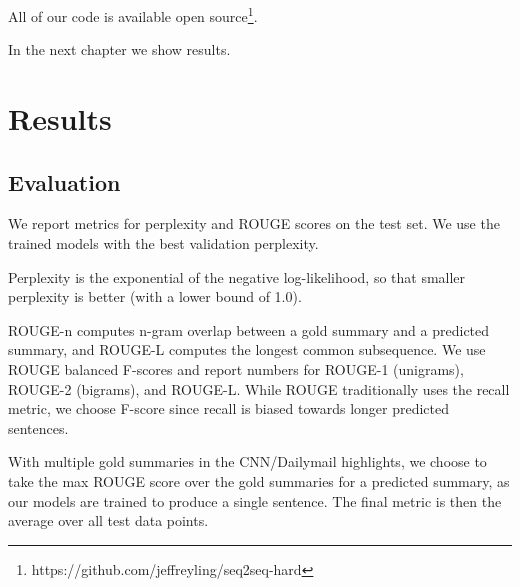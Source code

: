 \documentclass[12pt]{report}
\begin{document}
All of our code is available open source\footnote{https://github.com/jeffreyling/seq2seq-hard}.

In the next chapter we show results.

\chapter{Results}
\label{chap:results}

\section{Evaluation}

We report metrics for perplexity and ROUGE scores \citep{lin2004rouge} on the test set. We use the trained models with the best validation perplexity.

Perplexity is the exponential of the negative log-likelihood, so that smaller perplexity is better (with a lower bound of 1.0).

ROUGE-n computes n-gram overlap between a gold summary and a predicted summary, and ROUGE-L computes the longest common subsequence.
We use ROUGE balanced F-scores and report numbers for ROUGE-1 (unigrams), ROUGE-2 (bigrams), and ROUGE-L. While ROUGE traditionally uses the recall metric, we choose F-score since recall is biased towards longer predicted sentences.

With multiple gold summaries in the CNN/Dailymail highlights, we choose to take the max ROUGE score over the gold summaries for a predicted summary, as our models are trained to produce a single sentence. The final metric is then the average over all test data points. %
\end{document}
